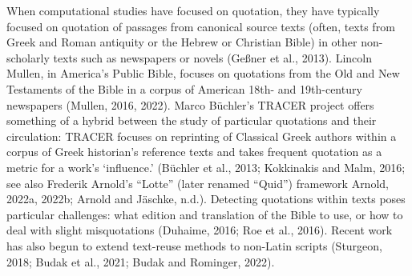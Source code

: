 \documentclass[
]{article}
\begin{document}
When computational studies have focused on quotation, they have
typically focused on quotation of passages from canonical source texts
(often, texts from Greek and Roman antiquity or the Hebrew or Christian
Bible) in other non-scholarly texts such as newspapers or novels (Geßner
et al., 2013). Lincoln Mullen, in America's Public Bible, focuses on
quotations from the Old and New Testaments of the Bible in a corpus of
American 18th- and 19th-century newspapers (Mullen, 2016, 2022). Marco
Büchler's TRACER project offers something of a hybrid between the study
of particular quotations and their circulation: TRACER focuses on
reprinting of Classical Greek authors within a corpus of Greek
historian's reference texts and takes frequent quotation as a metric for
a work's `influence.' (Büchler et al., 2013; Kokkinakis and Malm, 2016;
see also Frederik Arnold's {``Lotte''} (later renamed {``Quid''})
framework Arnold, 2022a, 2022b; Arnold and Jäschke, n.d.). Detecting
quotations within texts poses particular challenges: what edition and
translation of the Bible to use, or how to deal with slight
misquotations (Duhaime, 2016; Roe et al., 2016). Recent work has also
begun to extend text-reuse methods to non-Latin scripts (Sturgeon, 2018;
Budak et al., 2021; Budak and Rominger, 2022).
\end{document}

